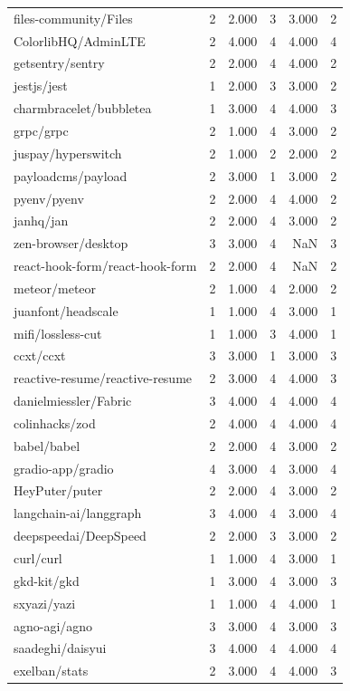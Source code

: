 \begin{tabular}{lrrrrr}
files-community/Files & 2 & 2.000 & 3 & 3.000 & 2 \\
ColorlibHQ/AdminLTE & 2 & 4.000 & 4 & 4.000 & 4 \\
getsentry/sentry & 2 & 2.000 & 4 & 4.000 & 2 \\
jestjs/jest & 1 & 2.000 & 3 & 3.000 & 2 \\
charmbracelet/bubbletea & 1 & 3.000 & 4 & 4.000 & 3 \\
grpc/grpc & 2 & 1.000 & 4 & 3.000 & 2 \\
juspay/hyperswitch & 2 & 1.000 & 2 & 2.000 & 2 \\
payloadcms/payload & 2 & 3.000 & 1 & 3.000 & 2 \\
pyenv/pyenv & 2 & 2.000 & 4 & 4.000 & 2 \\
janhq/jan & 2 & 2.000 & 4 & 3.000 & 2 \\
zen-browser/desktop & 3 & 3.000 & 4 & NaN & 3 \\
react-hook-form/react-hook-form & 2 & 2.000 & 4 & NaN & 2 \\
meteor/meteor & 2 & 1.000 & 4 & 2.000 & 2 \\
juanfont/headscale & 1 & 1.000 & 4 & 3.000 & 1 \\
mifi/lossless-cut & 1 & 1.000 & 3 & 4.000 & 1 \\
ccxt/ccxt & 3 & 3.000 & 1 & 3.000 & 3 \\
reactive-resume/reactive-resume & 2 & 3.000 & 4 & 4.000 & 3 \\
danielmiessler/Fabric & 3 & 4.000 & 4 & 4.000 & 4 \\
colinhacks/zod & 2 & 4.000 & 4 & 4.000 & 4 \\
babel/babel & 2 & 2.000 & 4 & 3.000 & 2 \\
gradio-app/gradio & 4 & 3.000 & 4 & 3.000 & 4 \\
HeyPuter/puter & 2 & 2.000 & 4 & 3.000 & 2 \\
langchain-ai/langgraph & 3 & 4.000 & 4 & 3.000 & 4 \\
deepspeedai/DeepSpeed & 2 & 2.000 & 3 & 3.000 & 2 \\
curl/curl & 1 & 1.000 & 4 & 3.000 & 1 \\
gkd-kit/gkd & 1 & 3.000 & 4 & 3.000 & 3 \\
sxyazi/yazi & 1 & 1.000 & 4 & 4.000 & 1 \\
agno-agi/agno & 3 & 3.000 & 4 & 3.000 & 3 \\
saadeghi/daisyui & 3 & 4.000 & 4 & 4.000 & 4 \\
exelban/stats & 2 & 3.000 & 4 & 4.000 & 3 \\

\end{tabular}
